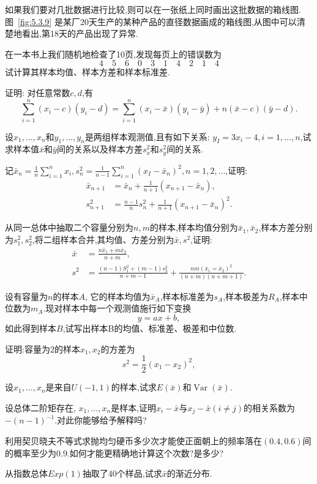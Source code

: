 如果我们要对几批数据进行比较,则可以在一张纸上同时画出这批数据的箱线图.图~\ref{fig:5.3.9} 是某厂20天生产的某种产品的直径数据画成的箱线图,从图中可以清楚地看出,第18天的产品出现了异常.
\begin{xiti}
\item 在一本书上我们随机地检查了10页,发现每页上的错误数为
\[4\quad5\quad6\quad0\quad3\quad1\quad4\quad2\quad1\quad4\]
试计算其样本均值、样本方差和样本标准差.
\item 证明: 对任意常数$c,d$,有
\[\sum_{i=1}^n(x_i-c)(y_i-d)=\sum_{i=1}^n(x_i-\bar x)(y_i-\bar y)+n(\bar x-c)(\bar y-d).\]
\item 设$x_1,\dotsc,x_n$和$y_1,\dotsc,y_n$是两组样本观测值,且有如下关系: $y_I=3x_i-4,i=1,\dotsc,n$,试求样本值$\bar x$和$\bar y$间的关系以及样本方差$s_x^2$和$s_y^2$间的关系.
\item 记$\bar x_n=\frac1n\sum_{i=1}^n x_i,s_n^2=\frac1{n-1}\sum_{i=1}^n(x_I-\bar x_n)^2,n=1,2,\dotsc$,证明:
\begin{align*}
\bar x_{n+1}&=\bar x_n+\frac1{n+1}(x_{n+1}-\bar x_n),\\
s_{n+1}^2&=\frac{n-1}ns_n^2+\frac1{n+1}(x_{n+1}-\bar x_n)^2.
\end{align*}
\item 从同一总体中抽取二个容量分别为$n,m$的样本,样本均值分别为$\bar x_1,\bar x_2$,样本方差分别为$s_1^2,s_2^2$,将二组样本合并,其均值、方差分别为$\bar x,s^2$,证明:
\begin{align*}
\bar x&=\frac{n\bar x_1+m\bar x_2}{n+m},\\
s^2&=\frac{(n-1)S_1^2+(m-1)s_2^2}{n+m-1}+\frac{nm(\bar x_1=\bar x_2)^2}{(n+m)(n+m+1)}.
\end{align*}
\item 设有容量为$n$的样本$A$, 它的样本均值为$\bar x_A$,样本标准差为$s_A$,样本极差为$R_A$,样本中位数为$m_A$.现对样本中每一个观测值施行如下变换
\[y=ax+b,\]
如此得到样本$B$,试写出样本B的均值、标准差、极差和中位数.
\item 证明:容量为$2$的样本$x_1,x_2$的方差为
\[s^2=\frac12(x_1-x_2)^2,\]
\item 设$x_1,\dotsc,x_n$是来自$U(-1,1)$的样本,试求$E(\bar x)$和$\operatorname{Var}(\bar x)$.
\item 设总体二阶矩存在, $x_1,\dotsc,x_n$是样本,证明$x_i-\bar x$与$x_j-\bar x(i\ne j)$的相关系数为$-(n-1)^{-1}$.对此你能够给予解释吗?
\item 利用契贝晓夫不等式求抛均匀硬币多少次才能使正面朝上的频率落在$(0.4,0.6)$间的概率至少为0.9.如何才能更精确地计算这个次数?是多少?
\item 从指数总体$Exp(1)$抽取了40个样品,试求$\bar x$的渐近分布.

\end{xiti}
